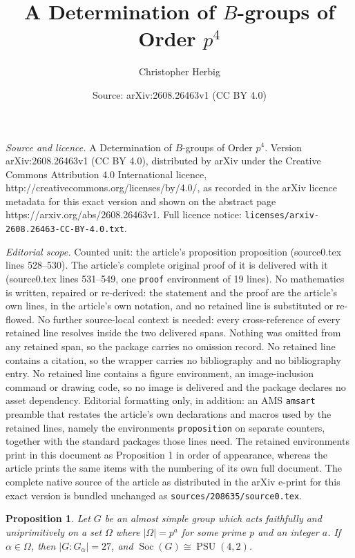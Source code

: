 \documentclass[10pt,a4paper]{amsart}
\title{A Determination of $B$-groups of Order $p^4$}
\author{Christopher Herbig}
\date{Source: arXiv:2608.26463v1 (CC BY 4.0)}
\newtheorem{proposition}{Proposition}
\DeclareMathOperator{\PSU}{PSU}
\DeclareMathOperator{\Soc}{Soc}
\begin{document}
\maketitle

\noindent\emph{Source and licence.} A Determination of $B$-groups of Order $p^4$. Version arXiv:2608.26463v1 (CC BY 4.0), distributed by arXiv under the Creative Commons Attribution 4.0 International licence, http://creativecommons.org/licenses/by/4.0/, as recorded in the arXiv licence metadata for this exact version and shown on the abstract page https://arxiv.org/abs/2608.26463v1. Full licence notice: \texttt{licenses/arxiv-2608.26463-CC-BY-4.0.txt}.\par\smallskip

\noindent\textit{Editorial scope.} Counted unit: the article's proposition proposition (source0.tex lines 528--530). The article's complete original proof of it is delivered with it (source0.tex lines 531--549, one \texttt{proof} environment of 19 lines). No mathematics is written, repaired or re-derived: the statement and the proof are the article's own lines, in the article's own notation, and no retained line is substituted or re-flowed.  No further source-local context is needed: every cross-reference of every retained line resolves inside the two delivered spans.  Nothing was omitted from any retained span, so the package carries no omission record.  No retained line contains a citation, so the wrapper carries no bibliography and no bibliography entry.  No retained line contains a figure environment, an image-inclusion command or drawing code, so no image is delivered and the package declares no asset dependency.  Editorial formatting only, in addition: an AMS \texttt{amsart} preamble that restates the article's own declarations and macros used by the retained lines, namely the environments \texttt{proposition} on separate counters, together with the standard packages those lines need.  The retained environments print in this document as Proposition 1 in order of appearance, whereas the article prints the same items with the numbering of its own full document.  The complete native source of the article as distributed in the arXiv e-print for this exact version is bundled unchanged as \texttt{sources/208635/source0.tex}.
\begin{proposition}
	Let $G$ be an almost simple group which acts faithfully and uniprimitively on a set $\Omega$ where $|\Omega| = p^a$ for some prime $p$ and an integer $a$. If $\alpha \in \Omega$, then $|G:G_\alpha| = 27$, and $\Soc(G) \cong \PSU(4,2)$.
\end{proposition}	
\end{document}
